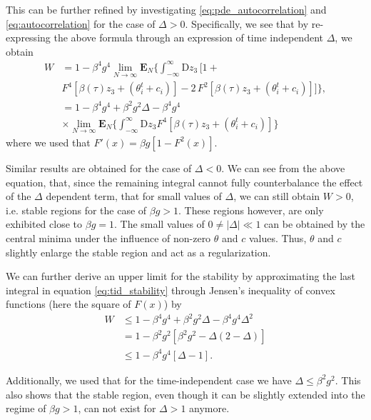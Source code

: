 \documentclass[reprint,amsmath,amssymb,aps]{revtex4-2}
\begin{document}
This can be further refined by investigating \eqref{eq:pde_autocorrelation} and \eqref{eq:autocorrelation} for the case of $\Delta>0$. Specifically, we see that by re-expressing the above formula through an expression of time independent $\Delta$, we obtain
\begin{align}
    W
    &=
    1 - \beta^4g^4 \lim_{N\to\infty} \mathbf{E}_{N} \Bigg\{
    \int_{-\infty}^\infty \mathrm{D}z_3 \, \Bigg[ 1 +
    \nonumber
    \\
    &
    F^4\left[\beta(\tau) z_3 + (\theta_i^t + c_i)\right]
    -2 \,
    F^2\left[\beta(\tau) z_3 + (\theta_i^t + c_i)\right]   
    \Bigg]
    \Bigg\},
    \nonumber
    \\
    &=
    1-\beta^4 g^4 + \beta^2 g^2 \Delta - \beta^4 g^4
    \nonumber
    \\
    &\times
    \lim_{N\to\infty} \mathbf{E}_{N} \Bigg\{
    \int_{-\infty}^\infty \mathrm{D}z_3 
    F^4\left[\beta(\tau) z_3 + (\theta_i^t + c_i)\right]\Bigg\}
    \label{eq:tid_stability}
\end{align}
where we used that $F'(x) = \beta g\left[1-F^2(x)\right]$. 

Similar results are obtained for the case of $\Delta<0$. We can see from the above equation, that, since the remaining integral cannot fully counterbalance the effect of the $\Delta$ dependent term, that for small values of $\Delta$, we can still obtain $W>0$, i.e. stable regions for the case of $\beta g>1$. These regions however, are only exhibited close to $\beta g=1$. The small values of $0\neq|\Delta|\ll 1$ can be obtained by the central minima under the influence of non-zero $\theta$ and $c$ values. Thus, $\theta$ and $c$ slightly enlarge the stable region and act as a regularization.

We can further derive an upper limit for the stability by approximating the last integral in equation \eqref{eq:tid_stability} through Jensen's inequality of convex functions (here the square of $F(x)$) by
\begin{align*}
    W
    &\leq
    1-\beta^4 g^4 + \beta^2 g^2\Delta -\beta^4 g^4 \Delta^2
    \\
    &=
    1-\beta^2 g^2\left[\beta^2 g^2-\Delta(2-\Delta)\right]  
    \\
    &\leq 1 - \beta^4 g^4 \left[ \Delta - 1 \right].
\end{align*}

Additionally, we used that for the time-independent case we have $\Delta\leq \beta^2 g^2$. This also shows that the stable region, even though it can be slightly extended into the regime of $\beta g>1$, can not exist for $\Delta>1$ anymore.
\end{document}
